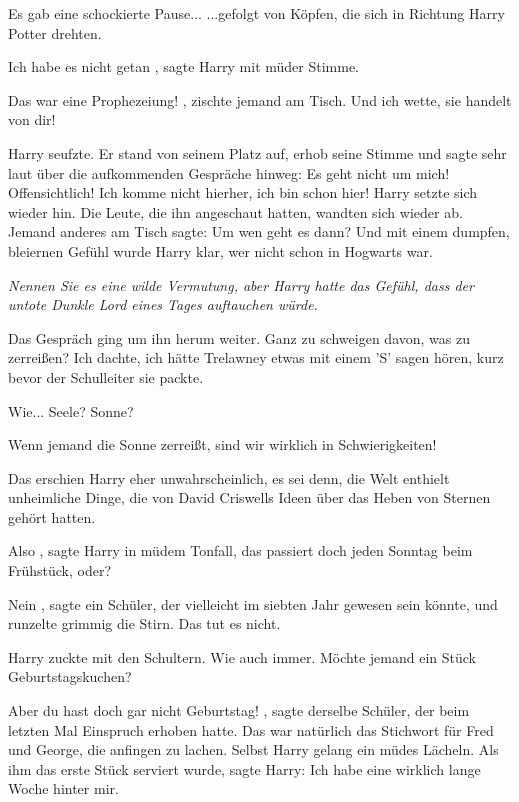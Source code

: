 Es gab eine schockierte Pause... ...gefolgt von Köpfen, die sich in Richtung
Harry Potter drehten.

\glqq Ich habe es nicht getan\grqq{} , sagte Harry mit müder Stimme.

\glqq Das war eine Prophezeiung!\grqq{} , zischte jemand am Tisch. \glqq Und ich
wette, sie handelt von dir!\grqq{}

Harry seufzte. Er stand von seinem Platz auf, erhob seine Stimme und sagte sehr
laut über die aufkommenden Gespräche hinweg: \glqq Es geht nicht um mich!
Offensichtlich! Ich komme nicht hierher, ich bin schon hier!\grqq{} Harry setzte
sich wieder hin. Die Leute, die ihn angeschaut hatten, wandten sich wieder ab.
Jemand anderes am Tisch sagte: \glqq Um wen geht es dann?\grqq{} Und mit einem
dumpfen, bleiernen Gefühl wurde Harry klar, wer nicht schon in Hogwarts war.

\emph{Nennen Sie es eine wilde Vermutung, aber Harry hatte das Gefühl, dass der
untote Dunkle Lord eines Tages auftauchen würde.}

Das Gespräch ging um ihn herum weiter. \glqq Ganz zu schweigen davon, was zu
zerreißen?\grqq{} \glqq Ich dachte, ich hätte Trelawney etwas mit einem 'S'
sagen hören, kurz bevor der Schulleiter sie packte.\grqq{}

\glqq Wie... Seele? Sonne?\grqq{}

\glqq Wenn jemand die Sonne zerreißt, sind wir wirklich in
Schwierigkeiten!\grqq{}

Das erschien Harry eher unwahrscheinlich, es sei denn, die Welt enthielt
unheimliche Dinge, die von David Criswells Ideen über das Heben von Sternen
gehört hatten.

\glqq Also\grqq{} , sagte Harry in müdem Tonfall, \glqq das passiert doch jeden
Sonntag beim Frühstück, oder?\grqq{}

\glqq Nein\grqq{} , sagte ein Schüler, der vielleicht im siebten Jahr gewesen
sein könnte, und runzelte grimmig die Stirn. \glqq Das tut es nicht.\grqq{}

Harry zuckte mit den Schultern. \glqq Wie auch immer. Möchte jemand ein Stück
Geburtstagskuchen?\grqq{}

\glqq Aber du hast doch gar nicht Geburtstag!\grqq{} , sagte derselbe Schüler,
der beim letzten Mal Einspruch erhoben hatte. Das war natürlich das Stichwort
für Fred und George, die anfingen zu lachen. Selbst Harry gelang ein müdes
Lächeln. Als ihm das erste Stück serviert wurde, sagte Harry: \glqq Ich habe
eine wirklich lange Woche hinter mir.\grqq{}

